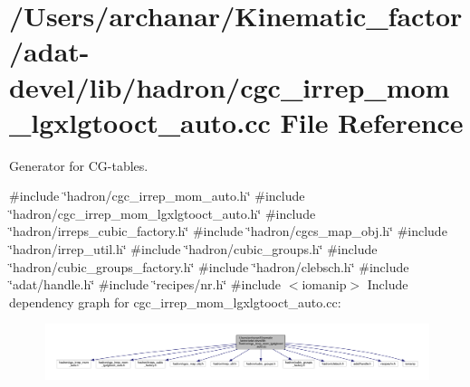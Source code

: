 \hypertarget{adat-devel_2lib_2hadron_2cgc__irrep__mom__lgxlgtooct__auto_8cc}{}\section{/\+Users/archanar/\+Kinematic\+\_\+factor/adat-\/devel/lib/hadron/cgc\+\_\+irrep\+\_\+mom\+\_\+lgxlgtooct\+\_\+auto.cc File Reference}
\label{adat-devel_2lib_2hadron_2cgc__irrep__mom__lgxlgtooct__auto_8cc}


Generator for C\+G-\/tables.  


{\ttfamily \#include \char`\"{}hadron/cgc\+\_\+irrep\+\_\+mom\+\_\+auto.\+h\char`\"{}}\newline
{\ttfamily \#include \char`\"{}hadron/cgc\+\_\+irrep\+\_\+mom\+\_\+lgxlgtooct\+\_\+auto.\+h\char`\"{}}\newline
{\ttfamily \#include \char`\"{}hadron/irreps\+\_\+cubic\+\_\+factory.\+h\char`\"{}}\newline
{\ttfamily \#include \char`\"{}hadron/cgcs\+\_\+map\+\_\+obj.\+h\char`\"{}}\newline
{\ttfamily \#include \char`\"{}hadron/irrep\+\_\+util.\+h\char`\"{}}\newline
{\ttfamily \#include \char`\"{}hadron/cubic\+\_\+groups.\+h\char`\"{}}\newline
{\ttfamily \#include \char`\"{}hadron/cubic\+\_\+groups\+\_\+factory.\+h\char`\"{}}\newline
{\ttfamily \#include \char`\"{}hadron/clebsch.\+h\char`\"{}}\newline
{\ttfamily \#include \char`\"{}adat/handle.\+h\char`\"{}}\newline
{\ttfamily \#include \char`\"{}recipes/nr.\+h\char`\"{}}\newline
{\ttfamily \#include $<$iomanip$>$}\newline
Include dependency graph for cgc\+\_\+irrep\+\_\+mom\+\_\+lgxlgtooct\+\_\+auto.\+cc\+:
\nopagebreak
\begin{figure}[H]
\begin{center}
\leavevmode
\includegraphics[width=350pt]{d6/dfc/adat-devel_2lib_2hadron_2cgc__irrep__mom__lgxlgtooct__auto_8cc__incl}
\end{center}
\end{figure}
